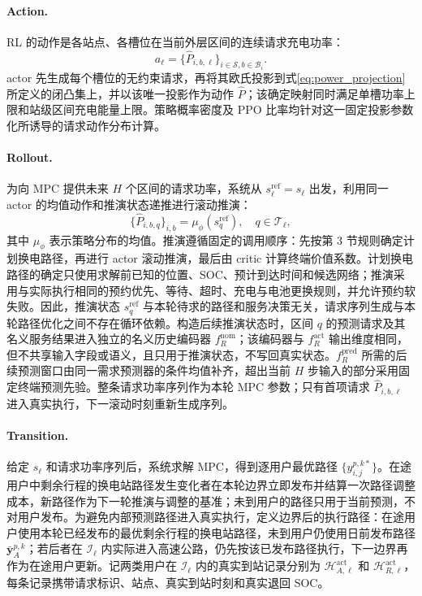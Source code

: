 \documentclass[12pt,a4paper,UTF8]{ctexart}
\begin{document}
\paragraph{Action.}
RL 的动作是各站点、各槽位在当前外层区间的连续请求充电功率：
\begin{equation}
a_\ell=
\{\widehat P_{i,b,\ell}\}_{i\in\mathcal S,b\in\mathcal B_i}.
\label{eq:rl_action}
\end{equation}
actor 先生成每个槽位的无约束请求，再将其欧氏投影到式\eqref{eq:power_projection}所定义的闭凸集上，并以该唯一投影作为动作 $\widehat P$；该确定映射同时满足单槽功率上限和站级区间充电能量上限。策略概率密度及 PPO 比率均针对这一固定投影参数化所诱导的请求动作分布计算。

\paragraph{Rollout.}
为向 MPC 提供未来 $H$ 个区间的请求功率，系统从
$s_{\ell}^{\mathrm{ref}}=s_\ell$ 出发，利用同一 actor 的均值动作和推演状态递推进行滚动推演：
\begin{equation}
\{\widehat P_{i,b,q}\}_{i,b}
=
\mu_\phi(s_{q}^{\mathrm{ref}}),
\quad q\in\mathcal T_\ell,
\label{eq:rl_power_rollout}
\end{equation}
其中 $\mu_\phi$ 表示策略分布的均值。推演遵循固定的调用顺序：先按第 3 节规则确定计划换电路径，再进行 actor 滚动推演，最后由 critic 计算终端价值系数。计划换电路径的确定只使用求解前已知的位置、SOC、预计到达时间和候选网络；推演采用与实际执行相同的预约优先、等待、超时、充电与电池更换规则，并允许预约软失败。因此，推演状态 $s_q^{\mathrm{ref}}$ 与本轮待求的路径和服务决策无关，请求序列生成与本轮路径优化之间不存在循环依赖。构造后续推演状态时，区间 $q$ 的预测请求及其名义服务结果进入独立的名义历史编码器 $f_R^{\mathrm{nom}}$；该编码器与 $f_R^{\mathrm{act}}$ 输出维度相同，但不共享输入字段或语义，且只用于推演状态，不写回真实状态。$f_R^{\mathrm{pred}}$ 所需的后续预测窗口由同一需求预测器的条件均值补齐，超出当前 $H$ 步输入的部分采用固定终端预测先验。整条请求功率序列作为本轮 MPC 参数；只有首项请求 $\widehat P_{i,b,\ell}$ 进入真实执行，下一滚动时刻重新生成序列。

\paragraph{Transition.}
给定 $s_\ell$ 和请求功率序列后，系统求解 MPC，得到逐用户最优路径
$\{y_{i,j}^{p,k*}\}$。在途用户中剩余行程的换电站路径发生变化者在本轮边界立即发布并结算一次路径调整成本，新路径作为下一轮推演与调整的基准；未到用户的路径只用于当前预测，不对用户发布。为避免内部预测路径进入真实执行，定义边界后的执行路径：在途用户使用本轮已经发布的最优剩余行程的换电站路径，未到用户仍使用日前发布路径 $\bar{\mathbf y}_{A}^{p,k}$；若后者在 $\mathcal I_\ell$ 内实际进入高速公路，仍先按该已发布路径执行，下一边界再作为在途用户更新。记两类用户在 $\mathcal I_\ell$ 内的真实到站记录分别为 $\mathcal H_{A,\ell}^{\mathrm{act}}$ 和 $\mathcal H_{R,\ell}^{\mathrm{act}}$，每条记录携带请求标识、站点、真实到站时刻和真实退回 SOC。
\end{document}

